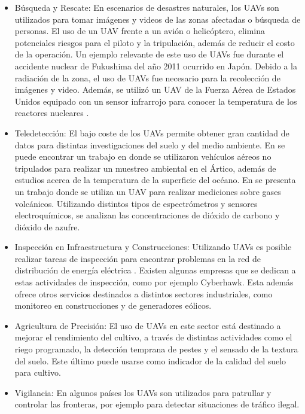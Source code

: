 \begin{itemize}
    \item Búsqueda y Rescate: En escenarios de desastres naturales, los UAVs son utilizados para tomar imágenes y videos de las zonas afectadas o búsqueda de personas. El uso de un UAV frente a un avión o helicóptero, elimina potenciales riesgos para el piloto y la tripulación, además de reducir el costo de la operación. Un ejemplo relevante de este uso de UAVs fue durante el accidente nuclear de Fukushima del año 2011 ocurrido en Japón. Debido a la radiación de la zona, el uso de UAVs fue necesario para la recolección de imágenes y video. Además, se utilizó un UAV de la Fuerza Aérea de Estados Unidos equipado con un sensor infrarrojo para conocer la temperatura de los reactores nucleares \cite{adams2011survey}.
    \item Teledetección: El bajo coste de los UAVs permite obtener gran cantidad de datos para distintas investigaciones del suelo y del medio ambiente. En \cite{villa2016overview} se puede encontrar un trabajo en donde se utilizaron vehículos aéreos no tripulados para realizar un muestreo ambiental en el Ártico, además de estudios acerca de la temperatura de la superficie del océano. En \cite{mcgonigle2008unmanned} se presenta un trabajo donde se utiliza un UAV para realizar mediciones sobre gases volcánicos. Utilizando distintos tipos de espectrómetros y sensores electroquímicos, se analizan las concentraciones de dióxido de carbono y dióxido de azufre.
    \item Inspección en Infraestructura y Construcciones: Utilizando UAVs es posible realizar tareas de inspección para encontrar problemas en la red de distribución de energía eléctrica \cite{luque2014power}. Existen algunas empresas que se dedican a estas actividades de inspección, como por ejemplo Cyberhawk. Esta además ofrece otros servicios destinados a distintos sectores industriales, como monitoreo en construcciones y de generadores eólicos.
    \item Agricultura de Precisión: El uso de UAVs en este sector está destinado a mejorar el rendimiento del cultivo, a través de distintas actividades como el riego programado, la detección temprana de pestes y el sensado de la textura del suelo. Este último puede usarse como indicador de la calidad del suelo para cultivo.
    \item Vigilancia: En algunos países los UAVs son utilizados para patrullar y controlar las fronteras, por ejemplo para detectar situaciones de tráfico ilegal.
\end{itemize}

